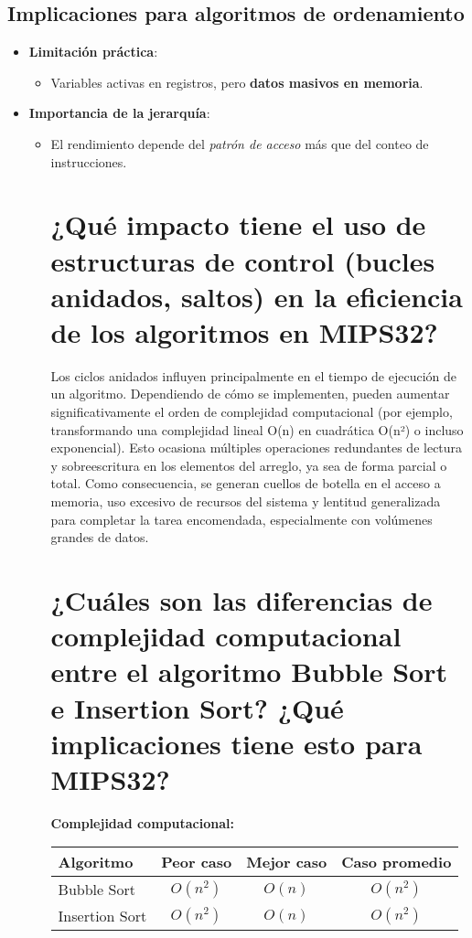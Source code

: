 \documentclass{article}
\begin{document}
\subsection*{Implicaciones para algoritmos de ordenamiento}
\begin{itemize}
    \item \textbf{Limitación práctica}:
    \begin{itemize}[label=--]
        \item Variables activas en registros, pero \textbf{datos masivos en memoria}.
    \end{itemize}
    
    \item \textbf{Importancia de la jerarquía}:
    \begin{itemize}[label=--]
        \item El rendimiento depende del \textit{patrón de acceso} más que del conteo de instrucciones.

\section{¿Qué impacto tiene el uso de estructuras de control (bucles anidados, saltos) en la eficiencia de los algoritmos en MIPS32?}

Los ciclos anidados influyen principalmente en el tiempo de ejecución de un algoritmo. Dependiendo de cómo se implementen, pueden aumentar significativamente el orden de complejidad computacional (por ejemplo, transformando una complejidad lineal O(n) en cuadrática O(n²) o incluso exponencial). Esto ocasiona múltiples operaciones redundantes de lectura y sobreescritura en los elementos del arreglo, ya sea de forma parcial o total. Como consecuencia, se generan cuellos de botella en el acceso a memoria, uso excesivo de recursos del sistema y lentitud generalizada para completar la tarea encomendada, especialmente con volúmenes grandes de datos.

\section{¿Cuáles son las diferencias de complejidad computacional entre el algoritmo Bubble Sort e Insertion Sort? ¿Qué implicaciones tiene esto para MIPS32?}

\textbf{Complejidad computacional:}
\begin{center}
    \begin{tabular}{lccc}
        \toprule
        \textbf{Algoritmo} & \textbf{Peor caso} & \textbf{Mejor caso} & \textbf{Caso promedio} \\
        \midrule
        Bubble Sort & $O(n^2)$ & $O(n)$ & $O(n^2)$ \\
        Insertion Sort & $O(n^2)$ & $O(n)$ & $O(n^2)$ \\
        \bottomrule
    \end{tabular}
\end{center}


\end{itemize}
\end{itemize}
\end{document}
